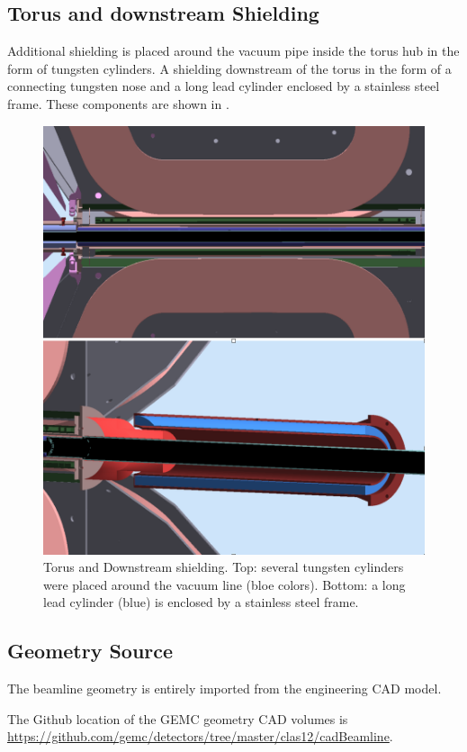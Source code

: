 \subsection{Torus and downstream Shielding}
Additional shielding is placed around the vacuum pipe inside the torus hub in the form of tungsten cylinders.
A shielding downstream of the torus in the form of a connecting tungsten nose and a long lead cylinder enclosed by a stainless steel frame.
These components are shown in .

\begin{figure}
	\centering
	\includegraphics[width=0.98\columnwidth,keepaspectratio]{img/downstreamShielding.png}
	\caption{Torus and Downstream shielding. Top: several tungsten cylinders were placed around the vacuum line (bloe colors).
            Bottom: a long lead cylinder (blue) is enclosed by a stainless steel frame.}
	\label{fig:downstreamShielding}
\end{figure}



\subsection{Geometry Source}

The beamline geometry is entirely imported from the engineering CAD model.

The Github location of the GEMC geometry CAD volumes is \url{https://github.com/gemc/detectors/tree/master/clas12/cadBeamline}.
